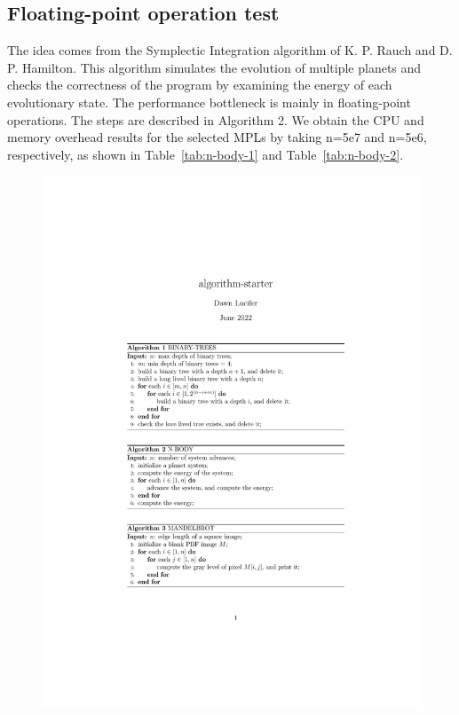 \subsection{Floating-point operation test}

The idea comes from the Symplectic Integration algorithm of K. P. Rauch
and D. P. Hamilton.
This algorithm simulates the evolution of multiple planets and checks the correctness of the program by examining the energy of each evolutionary state. The performance bottleneck is mainly in floating-point operations.
The steps are described in Algorithm 2.
We obtain the CPU and memory overhead results
for the selected MPLs by taking n=5e7 and n=5e6, respectively,
as shown in Table~\ref{tab:n-body-1} and Table~\ref{tab:n-body-2}.

\begin{figure}[htbp]
    \centerline{\includegraphics[scale=0.8]{figures/n-body}}
    \label{fig:n-body}
\end{figure}

